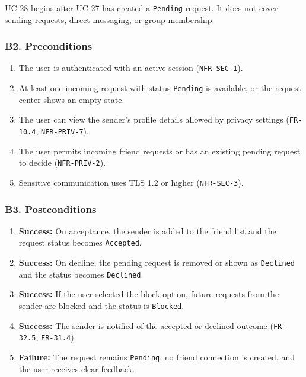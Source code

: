 \documentclass[12pt]{article}
\begin{document}
UC-28 begins after UC-27 has created a \texttt{Pending} request. It does not cover sending requests, direct messaging, or group membership.
\par\medskip

\hypertarget{sec:b2-preconditions}{}
\subsubsection*{B2. Preconditions}
\par\medskip

\begin{enumerate}
\item The user is authenticated with an active session (\texttt{NFR-SEC-1}).
\item At least one incoming request with status \texttt{Pending} is available, or the request center shows an empty state.
\item The user can view the sender's profile details allowed by privacy settings (\texttt{FR-10.4}, \texttt{NFR-PRIV-7}).
\item The user permits incoming friend requests or has an existing pending request to decide (\texttt{NFR-PRIV-2}).
\item Sensitive communication uses TLS 1.2 or higher (\texttt{NFR-SEC-3}).
\end{enumerate}
\par\medskip

\hypertarget{sec:b3-postconditions}{}
\subsubsection*{B3. Postconditions}
\par\medskip

\begin{enumerate}
\item \textbf{Success:} On acceptance, the sender is added to the friend list and the request status becomes \texttt{Accepted}.
\item \textbf{Success:} On decline, the pending request is removed or shown as \texttt{Declined} and the status becomes \texttt{Declined}.
\item \textbf{Success:} If the user selected the block option, future requests from the sender are blocked and the status is \texttt{Blocked}.
\item \textbf{Success:} The sender is notified of the accepted or declined outcome (\texttt{FR-32.5}, \texttt{FR-31.4}).
\item \textbf{Failure:} The request remains \texttt{Pending}, no friend connection is created, and the user receives clear feedback.
\end{enumerate}
\par\medskip
\end{document}
